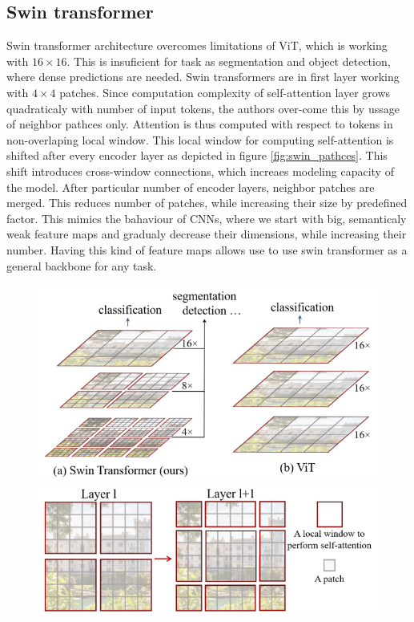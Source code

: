 \subsection{Swin transformer}
Swin transformer architecture overcomes limitations of ViT, which is working with $16 \times 16$. This is insuficient for task as segmentation and object detection, where dense predictions are needed. Swin transformers are in first layer working with $4 \times 4$ patches. Since computation complexity of self-attention layer grows quadraticaly with number of input tokens, the authors over-come this by ussage of neighbor pathces only. Attention is thus computed with respect to tokens in non-overlaping local window. This local window for computing  self-attention is shifted after every encoder layer as depicted in figure \ref{fig:swin_pathces}. This shift introduces cross-window connections, which increaes modeling capacity of the model. After particular number of encoder layers, neighbor patches are merged. This reduces number of patches, while increasing their size by predefined factor. This mimics the bahaviour of CNNs, where we start with big, semanticaly weak feature maps and gradualy decrease their dimensions, while increasing their number. Having this kind of feature maps allows use to use swin transformer as a general backbone for any task. \cite{Liu2021}

\begin{figure}
    \begin{floatrow}[2]
        {\includegraphics[width=\linewidth]{images/swint_transformer_hierarchy.png}}\qquad
        {\includegraphics[width=\linewidth]{images/swint_transformer_patches.png}}
    \end{floatrow}
\end{figure}


